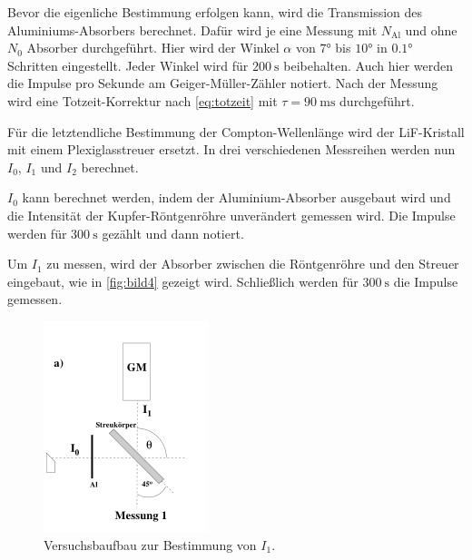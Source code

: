 Bevor die eigenliche Bestimmung erfolgen kann, wird die Transmission des Aluminiums-Absorbers berechnet.
Dafür wird je eine Messung mit $N_\text{Al}$ und ohne $N_0$ Absorber durchgeführt.
Hier wird der Winkel $\alpha$ von $\ang{7}$ bis $\ang{10}$ in  $\ang{0.1}$ Schritten eingestellt.
Jeder Winkel wird für $\SI{200}{\second}$ beibehalten.
Auch hier werden die Impulse pro Sekunde am Geiger-Müller-Zähler notiert.
Nach der Messung wird eine Totzeit-Korrektur nach \autoref{eq:totzeit} mit $\tau = \SI{90}{\milli\second}$ durchgeführt.

Für die letztendliche Bestimmung der Compton-Wellenlänge wird der LiF-Kristall mit einem Plexiglasstreuer ersetzt.
In drei verschiedenen Messreihen werden nun $I_0$, $I_1$ und $I_2$ berechnet.

$I_0$ kann berechnet werden, indem der Aluminium-Absorber ausgebaut wird und die Intensität der Kupfer-Röntgenröhre unverändert gemessen wird.
Die Impulse werden für $\SI{300}{\second}$ gezählt und dann notiert.

Um $I_1$ zu messen, wird der Absorber zwischen die Röntgenröhre und den Streuer eingebaut, wie in \autoref{fig:bild4} gezeigt wird.
Schließlich werden für $\SI{300}{\second}$ die Impulse gemessen.

\begin{figure}
    \centering
    \includegraphics[width=\textwidth/2]{images/bild4.png}
    \caption{Versuchsbaufbau zur Bestimmung von $I_1$. \cite{V603}}
    \label{fig:bild4}
\end{figure}

